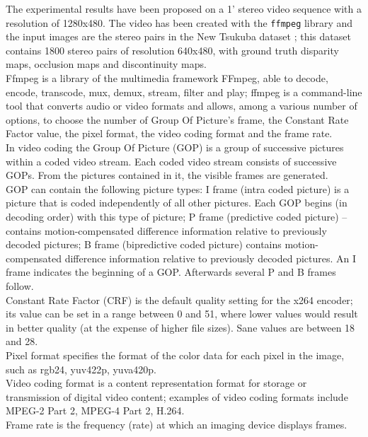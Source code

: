 The experimental results have been proposed on a 1' stereo video sequence with a resolution of 1280x480. The video has been created with the \texttt{ffmpeg} library \cite{ffmpeg} and the input images are the stereo pairs in the New Tsukuba dataset \cite{tsu}; this dataset contains 1800 stereo pairs of resolution 640x480, with ground truth disparity maps, occlusion maps and discontinuity maps.\\
Ffmpeg is a library of the multimedia framework FFmpeg, able to decode, encode, transcode, mux, demux, stream, filter and play; ffmpeg is a command-line tool that converts audio or video formats and allows, among a various number of options, to choose the number of Group Of Picture's frame, the Constant Rate Factor value, the pixel format, the video coding format and the frame rate.\\
In video coding the Group Of Picture (GOP) is a group of successive pictures within a coded video stream. Each coded video stream consists of successive GOPs. From the pictures contained in it, the visible frames are generated.\\
GOP can contain the following picture types:
I frame (intra coded picture) is  a picture that is coded independently of all other pictures. Each GOP begins (in decoding order) with this type of picture; P frame (predictive coded picture) – contains motion-compensated difference information relative to previously decoded pictures;  B frame (bipredictive coded picture) contains motion-compensated difference information relative to previously decoded pictures. An I frame indicates the beginning of a GOP. Afterwards several P and B frames follow.\\
Constant Rate Factor (CRF) is the default quality setting for the x264 encoder; its value can be set in a range between 0 and 51, where lower values would result in better quality (at the expense of higher file sizes). Sane values are between 18 and 28. \\
Pixel format specifies the format of the color data for each pixel in the image, such as rgb24, yuv422p, yuva420p.\\
Video coding format is a content representation format for storage or transmission of digital video content; examples of video coding formats include MPEG-2 Part 2, MPEG-4 Part 2, H.264.\\
Frame rate is the frequency (rate) at which an imaging device displays frames.\\

